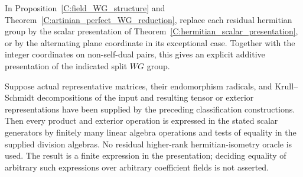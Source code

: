 \begin{corollary}
\label{C:WG_hermitian_scalar_operations}
In Proposition~\ref{C:field_WG_structure} and
Theorem~\ref{C:artinian_perfect_WG_reduction}, replace each residual
hermitian group by the scalar presentation of
Theorem~\ref{C:hermitian_scalar_presentation}, or by the alternating
plane coordinate in its exceptional case. Together with the integer
coordinates on non-self-dual pairs, this gives an explicit additive
presentation of the indicated split $WG$ group.

Suppose actual representative matrices, their endomorphism radicals,
and Krull--Schmidt decompositions of the input and resulting
tensor or exterior representations have been supplied by the preceding
classification constructions. Then every product and exterior
operation is expressed in the stated scalar generators by finitely
many linear algebra operations and tests of equality in the supplied
division algebras. No residual higher-rank hermitian-isometry oracle
is used. The result is a finite expression in the presentation;
deciding equality of arbitrary such expressions over arbitrary
coefficient fields is not asserted.
\end{corollary}
